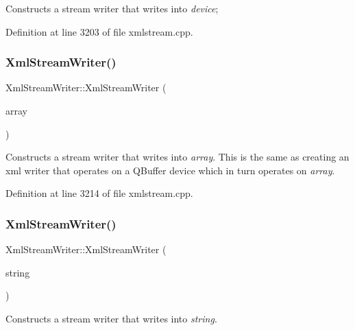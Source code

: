 Constructs a stream writer that writes into {\itshape device}; 

Definition at line 3203 of file xmlstream.\+cpp.

\mbox{\label{class_xml_stream_writer_a59044bd63fb4f1bf1c615666a44ea325}} 
\subsubsection{\texorpdfstring{Xml\+Stream\+Writer()}{XmlStreamWriter()}\hspace{0.1cm}{\footnotesize\ttfamily [3/4]}}
{\footnotesize\ttfamily Xml\+Stream\+Writer\+::\+Xml\+Stream\+Writer (\begin{DoxyParamCaption}\item[{Q\+Byte\+Array $\ast$}]{array }\end{DoxyParamCaption})\hspace{0.3cm}{\ttfamily [explicit]}}

Constructs a stream writer that writes into {\itshape array}. This is the same as creating an xml writer that operates on a Q\+Buffer device which in turn operates on {\itshape array}. 

Definition at line 3214 of file xmlstream.\+cpp.

\mbox{\label{class_xml_stream_writer_a149da545bb2fa21dbb6989c0eab6cf99}} 
\subsubsection{\texorpdfstring{Xml\+Stream\+Writer()}{XmlStreamWriter()}\hspace{0.1cm}{\footnotesize\ttfamily [4/4]}}
{\footnotesize\ttfamily Xml\+Stream\+Writer\+::\+Xml\+Stream\+Writer (\begin{DoxyParamCaption}\item[{Q\+String $\ast$}]{string }\end{DoxyParamCaption})\hspace{0.3cm}{\ttfamily [explicit]}}

Constructs a stream writer that writes into {\itshape string}. 

